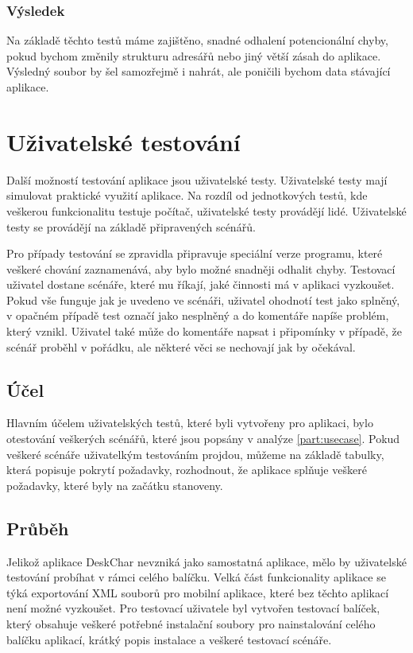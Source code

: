 \documentclass[thesis=B,czech]{resources/FITthesis}[2012/06/26]
\begin{document}
			\subsubsection*{Výsledek}
Na základě těchto testů máme zajištěno, snadné odhalení potencionální chyby, pokud bychom změnily strukturu adresářů nebo jiný větší zásah do aplikace. Výsledný soubor by šel samozřejmě i nahrát, ale poničili bychom data stávající aplikace.

\section{Uživatelské testování}
Další možností testování aplikace jsou uživatelské testy. Uživatelské testy mají simulovat praktické využití aplikace. Na rozdíl od jednotkových testů, kde veškerou funkcionalitu testuje počítač, uživatelské testy provádějí lidé. Uživatelské testy se provádějí na základě připravených scénářů. \par

Pro případy testování se zpravidla připravuje speciální verze programu, které veškeré chování zaznamenává, aby bylo možné snadněji odhalit chyby. Testovací uživatel dostane scénáře, které mu říkají, jaké činnosti má v aplikaci vyzkoušet. Pokud vše funguje jak je uvedeno ve scénáři, uživatel ohodnotí test jako splněný, v opačném případě test označí jako nesplněný a do komentáře napíše problém, který vznikl. Uživatel také může do komentáře napsat i připomínky v případě, že scénář proběhl v pořádku, ale některé věci se nechovají jak by očekával. 

\subsection{Účel}
Hlavním účelem uživatelských testů, které byli vytvořeny pro aplikaci, bylo otestování veškerých scénářů, které jsou popsány v analýze \ref{part:usecase}. Pokud veškeré scénáře uživatelkým testováním projdou, můžeme na základě tabulky, která popisuje pokrytí požadavky, rozhodnout, že aplikace splňuje veškeré požadavky, které byly na začátku stanoveny. 

\subsection{Průběh}
Jelikož aplikace DeskChar nevzniká jako samostatná aplikace, mělo by uživatelské testování probíhat v rámci celého balíčku. Velká část funkcionality aplikace se týká exportování XML souborů pro mobilní aplikace, které bez těchto aplikací není možné vyzkoušet. Pro testovací uživatele byl vytvořen testovací balíček, který obsahuje veškeré potřebné instalační soubory pro nainstalování celého balíčku aplikací, krátký popis instalace a veškeré testovací scénáře. \par
\end{document}
